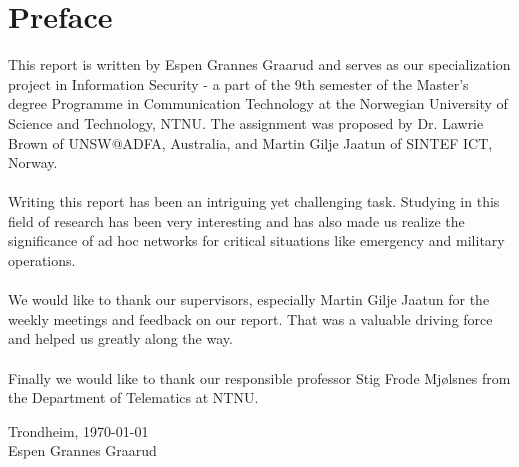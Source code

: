 \chapter*{Preface}

This report is written by Espen Grannes Graarud and serves as our specialization project in Information Security - a part of the 9th semester of the Master's degree Programme in Communication Technology at the Norwegian University of Science and Technology, NTNU. The assignment was proposed by Dr. Lawrie Brown of UNSW@ADFA, Australia, and Martin Gilje Jaatun of SINTEF ICT, Norway.
\\\\
Writing this report has been an intriguing yet challenging task. Studying in this field of research has been very interesting and has also made us realize the significance of ad hoc networks for critical situations like emergency and military operations.
\\\\
We would like to thank our supervisors, especially Martin Gilje Jaatun for the weekly meetings and feedback on our report. That was a valuable driving force and helped us greatly along the way.
\\\\
Finally we would like to thank our responsible professor Stig Frode Mj{\o}lsnes from the Department of Telematics at NTNU.

\begin{center}
\vspace{4cm}
\noindent Trondheim, \today
\vspace{2cm}
\\Espen Grannes Graarud
\end{center}
